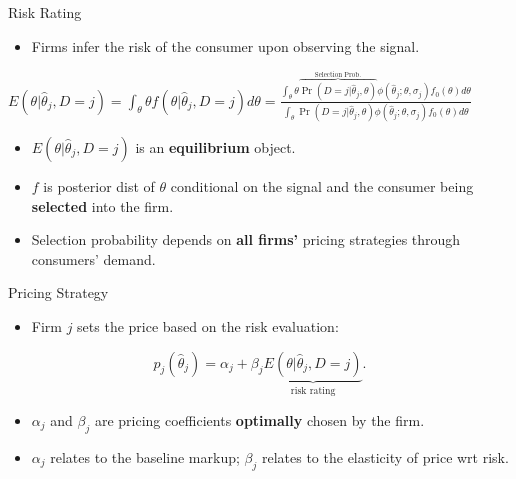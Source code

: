 \documentclass[10pt,aspectratio=169]{beamer}
\begin{document}
\begin{frame}{Risk Rating}
    \begin{itemize}
        \item Firms infer the risk of the consumer upon observing the signal.
    \end{itemize}
    
    \vspace{1cm} %
    
    \centering
    $E(\theta | \hat{\theta}_j, D=j) = \int_{\theta} \theta f(\theta | \hat{\theta}_j, D=j) d\theta = \frac{\int_{\theta} \theta \overbrace{\Pr(D=j | \hat{\theta}_j, \theta)}^{\text{Selection Prob.}} \phi(\hat{\theta}_j; \theta, \sigma_j) f_0(\theta) d\theta}{\int_{\theta} \Pr(D=j | \hat{\theta}_j, \theta) \phi(\hat{\theta}_j; \theta, \sigma_j) f_0(\theta) d\theta}$
    
    \vspace{1cm}
    
    \begin{itemize}
        \item $E(\theta | \hat{\theta}_j, D=j)$ is an \textbf{equilibrium} object.
        
        \item $f$ is posterior dist of $\theta$ conditional on the signal and the consumer being \textbf{selected} into the firm.
        
        \item Selection probability depends on \textbf{all firms'} pricing strategies through consumers' demand.
    \end{itemize}
\end{frame}

\begin{frame}{Pricing Strategy}
    \begin{itemize}
        \item Firm $j$ sets the price based on the risk evaluation:
    \end{itemize}

    \[
    p_j(\hat{\theta}_j) = \alpha_j + \beta_j \underbrace{E(\theta | \hat{\theta}_j, D=j)}_{\text{risk rating}}.
    \]

    \begin{itemize}
        \item $\alpha_j$ and $\beta_j$ are pricing coefficients \textbf{optimally} chosen by the firm.
        
        \item $\alpha_j$ relates to the baseline markup; $\beta_j$ relates to the elasticity of price wrt risk.
    \end{itemize}
\end{frame}
\end{document}
